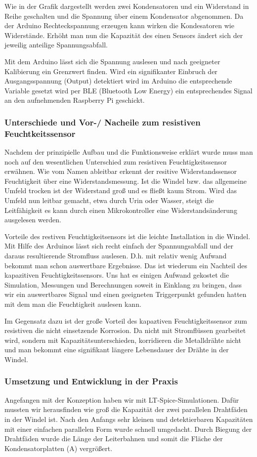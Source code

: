 Wie in der Grafik dargestellt werden zwei Kondensatoren und ein Widerstand in Reihe geschalten und die Spannung über einem Kondensator abgenommen. Da der Arduino Rechteckspannung erzeugen kann wirken die Kondesatoren wie Widerstände. Erhöht man nun die Kapazität des einen Sensors ändert sich der jeweilig anteilige Spannungsabfall.

Mit dem Arduino lässt sich die Spannung auslesen und nach geeigneter Kalibierung ein Grenzwert finden. Wird ein signifikanter Einbruch der Ausgangsspannung (Output) detektiert wird im Arduino die entsprechende Variable gesetzt wird per BLE (Bluetooth Low Energy) ein entsprechendes Signal an den aufnehmenden Raspberry Pi geschickt.

 
\subsubsection{Unterschiede und Vor-/ Nacheile zum resistiven Feuchtkeitssensor}
Nachdem der prinzipielle Aufbau und die Funktionsweise erklärt wurde muss man noch auf den wesentlichen Unterschied zum resistiven Feuchtigkeitssensor erwähnen. Wie vom Namen ableitbar erkennt der resitive Widerstandssensor Feuchtigkeit über eine Widerstandsmessung. Ist die Windel bzw. das allgemeine Umfeld trocken ist der Widerstand groß und es fließt kaum Strom. Wird das Umfeld nun leitbar gemacht, etwa durch Urin oder Wasser, steigt die Leitfähigkeit es kann durch einen Mikrokontroller eine Widerstandsänderung ausgelesen werden. 

Vorteile des restiven Feuchtigkeitsensors  ist die leichte Installation in die Windel. Mit Hilfe des Arduinos lässt sich recht einfach der Spannungsabfall und der daraus resultierende Stromfluss auslesen. D.h. mit relativ wenig Aufwand bekommt man schon auswertbare Ergebnisse. Das ist wiederum ein Nachteil des kapazitiven Feuchtigkeitssensors. Uns hat es einigen Aufwand gekostet die Simulation, Messungen und Berechnungen soweit in Einklang zu bringen, dass wir ein auswertbares Signal und einen geeigneten Triggerpunkt gefunden hatten mit dem man die Feuchtigkeit auslesen kann.

Im Gegensatz dazu ist der große Vorteil des kapaztiven Feuchtigkeitssensor zum resistiven die nicht einsetzende Korrosion. Da nicht mit Stromflüssen gearbeitet wird, sondern mit Kapazitätsunterschieden, korridieren die Metalldrähte nicht und man bekommt eine signifikant längere Lebensdauer der Drähte in der Windel.  
\pagebreak

\subsubsection{Umsetzung und Entwicklung in der Praxis}
Angefangen mit der Konzeption haben wir mit LT-Spice-Simulationen. Dafür mussten wir herausfinden wie groß die Kapazität der zwei parallelen Drahtfäden in der Windel ist. Nach den Anfangs sehr kleinen und detektierbaren Kapazitäten mit einer einfachen parallelen Form wurde schnell umgedacht. Durch Biegung der Drahtfäden wurde die Länge der Leiterbahnen und somit die Fläche der Kondensatorplatten (A) vergrößert.

